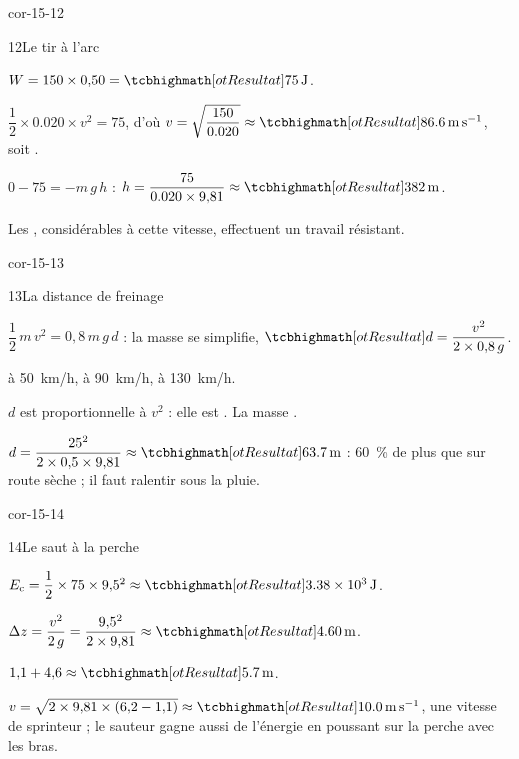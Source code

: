 \begin{blocLivre}{cor-15-12}
\begin{corrige}{12}{Le tir à l'arc}
\begin{questions}
\item $W=150\times0{,}50=\res{\qty{75}{J}}$.
\item $\dfrac{1}{2}\times\num{0,020}\times v^2=75$, d'où $v=\sqrt{\dfrac{150}{\num{0,020}}}\approx\res{\qty{86,6}{m.s^{-1}}}$, soit .
\item $0-75=-m\,g\,h$ : $h=\dfrac{75}{\num{0,020}\times9{,}81}\approx\res{\qty{382}{m}}$.
\item Les , considérables à cette vitesse, effectuent un travail résistant.
\end{questions}
\end{corrige}
\end{blocLivre}
\begin{blocLivre}{cor-15-13}
\begin{corrige}{13}{La distance de freinage}
\begin{questions}
\item $\dfrac{1}{2}\,m\,v^2=0{,}8\,m\,g\,d$ : la masse se simplifie, $\res{d=\dfrac{v^2}{2\times0{,}8\,g}}$.
\item {} à \qty{50}{km/h},  à \qty{90}{km/h},  à \qty{130}{km/h}.
\item $d$ est proportionnelle à $v^2$ : elle est . La masse .
\item $d=\dfrac{25^2}{2\times0{,}5\times9{,}81}\approx\res{\qty{63,7}{m}}$ : \qty{60}{\percent} de plus que sur route sèche ; il faut ralentir sous la pluie.
\end{questions}
\end{corrige}
\end{blocLivre}
\begin{blocLivre}{cor-15-14}
\begin{corrige}{14}{Le saut à la perche}
\begin{questions}
\item $E_\mathrm{c}=\dfrac{1}{2}\times75\times9{,}5^2\approx\res{\qty{3,38e3}{J}}$.
\item $\Delta z=\dfrac{v^2}{2\,g}=\dfrac{9{,}5^2}{2\times9{,}81}\approx\res{\qty{4,60}{m}}$.
\item $1{,}1+4{,}6\approx\res{\qty{5,7}{m}}$.
\item $v=\sqrt{2\times9{,}81\times(6{,}2-1{,}1)}\approx\res{\qty{10,0}{m.s^{-1}}}$, une vitesse de sprinteur ; le sauteur gagne aussi de l'énergie
en poussant sur la perche avec les bras.
\end{questions}
\end{corrige}
\end{blocLivre}
